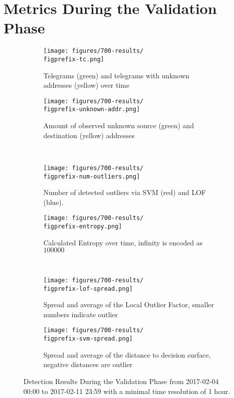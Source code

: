 \section{Metrics During the Validation Phase}
\label{app:metrics:validation}

\begin{figure}[H]
	\newcommand{\figwith}{0.49\textwidth}
	\newcommand{\figprefix}{validation}
	\centering
	
	\begin{subfigure}[b]{\figwith}
		\texttt{[image: figures/700-results/\\figprefix-tc.png]}
		\caption{Telegrams (green) and telegrams with unknown addresses (yellow) over time}
		\label{fig:results:\figprefix:tc}
	\end{subfigure}
	\hfil
	\begin{subfigure}[b]{\figwith}
		\texttt{[image: figures/700-results/\\figprefix-unknown-addr.png]}
		\caption{Amount of observed unknown source (green) and destination (yellow) addresses}
		\label{fig:results:\figprefix:addr}
	\end{subfigure}
	\\[1.5mm]
	\begin{subfigure}[b]{\figwith}
		\texttt{[image: figures/700-results/\\figprefix-num-outliers.png]}
		\caption{Number of detected outliers via SVM (red) and LOF (blue).}
		\label{fig:results:\figprefix:outlier}
	\end{subfigure}
	\hfil
	\begin{subfigure}[b]{\figwith}
		\texttt{[image: figures/700-results/\\figprefix-entropy.png]}
		\caption{Calculated Entropy over time, infinity is encoded as $100 000$}
		\label{fig:results:\figprefix:entropy}
	\end{subfigure}
	\\[1.5mm]
	\begin{subfigure}[b]{\figwith}
		\texttt{[image: figures/700-results/\\figprefix-lof-spread.png]}
		\caption{Spread and average of the Local Outlier Factor, smaller numbers indicate outlier}
		\label{fig:results:\figprefix:lof}
	\end{subfigure}
	\hfil
	\begin{subfigure}[b]{\figwith}
		\texttt{[image: figures/700-results/\\figprefix-svm-spread.png]}
		\caption{Spread and average of the distance to decision surface, negative distances are outlier}
		\label{fig:results:\figprefix:svm}
	\end{subfigure}
	
	\caption[Detection Results During the Validation Phase]{Detection Results During the Validation Phase from 2017-02-04 00:00 to 2017-02-11 23:59 with a minimal time resolution of 1 hour.}
	\label{fig:results:\figprefix}
	
\end{figure}

